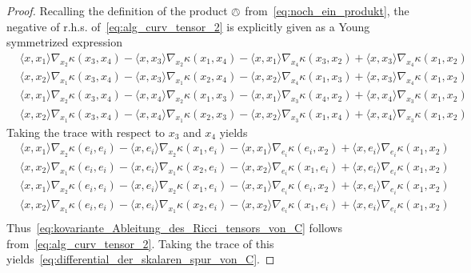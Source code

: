 \documentclass[11pt,a4paper]{article}
\theoremstyle{plain}
\theoremstyle{remark}
\begin{document}
\begin{proof}
Recalling the
definition of the product $\owedge$ from~\eqref{eq:noch_ein_produkt}, the
negative of r.h.s. of~\eqref{eq:alg_curv_tensor_2} is explicitly given as a
Young symmetrized expression
\begin{align*}
& \langle x,x_1\rangle \nabla_{x_2} \kappa(x_3,x_4) - \langle x,x_3\rangle \nabla_{x_2} \kappa(x_1,x_4) - \langle x,x_1\rangle \nabla_{x_4} \kappa(x_3,x_2) + \langle x,x_3\rangle \nabla_{x_4} \kappa(x_1,x_2)\\
& \langle x,x_2\rangle \nabla_{x_1} \kappa(x_3,x_4) - \langle x,x_3\rangle \nabla_{x_1} \kappa(x_2,x_4) - \langle x,x_2\rangle \nabla_{x_4} \kappa(x_1,x_3) + \langle x,x_3\rangle \nabla_{x_4} \kappa(x_1,x_2)\\
&  \langle x,x_1\rangle \nabla_{x_2} \kappa(x_3,x_4) - \langle x,x_4\rangle \nabla_{x_2} \kappa(x_1,x_3) - \langle x,x_1\rangle \nabla_{x_3} \kappa(x_4,x_2) + \langle x,x_4\rangle \nabla_{x_3} \kappa(x_1,x_2)\\
& \langle x,x_2\rangle \nabla_{x_1} \kappa(x_3,x_4) - \langle x,x_4\rangle \nabla_{x_1} \kappa(x_2,x_3) - \langle x,x_2\rangle \nabla_{x_3} \kappa(x_1,x_4) + \langle x,x_4\rangle \nabla_{x_3} \kappa(x_1,x_2)
\end{align*}
Taking the trace with respect to $x_3$ and $x_4$ yields
\begin{align*}
& \langle x,x_1\rangle \nabla_{x_2} \kappa(e_i,e_i) - \langle x,e_i\rangle \nabla_{x_2} \kappa(x_1,e_i) - \langle x,x_1\rangle \nabla_{e_i} \kappa(e_i,x_2) + \langle x,e_i\rangle \nabla_{e_i} \kappa(x_1,x_2)\\
& \langle x,x_2\rangle \nabla_{x_1} \kappa(e_i,e_i) - \langle x,e_i\rangle \nabla_{x_1} \kappa(x_2,e_i) - \langle x,x_2\rangle \nabla_{e_i} \kappa(x_1,e_i) + \langle x,e_i\rangle \nabla_{e_i} \kappa(x_1,x_2)\\
& \langle x,x_1\rangle \nabla_{x_2} \kappa(e_i,e_i) - \langle x,e_i\rangle \nabla_{x_2} \kappa(x_1,e_i) - \langle x,x_1\rangle \nabla_{e_i} \kappa(e_i,x_2) + \langle x,e_i\rangle \nabla_{e_i} \kappa(x_1,x_2)\\
& \langle x,x_2\rangle \nabla_{x_1} \kappa(e_i,e_i) - \langle x,e_i\rangle \nabla_{x_1} \kappa(x_2,e_i) - \langle x,x_2\rangle \nabla_{e_i} \kappa(x_1,e_i) + \langle x,e_i\rangle \nabla_{e_i} \kappa(x_1,x_2)\\
\end{align*}
Thus~\eqref{eq:kovariante_Ableitung_des_Ricci_tensors_von_C} follows from~\eqref{eq:alg_curv_tensor_2}. Taking the trace of this yields~\eqref{eq:differential_der_skalaren_spur_von_C}.
\end{proof}
\end{document}
